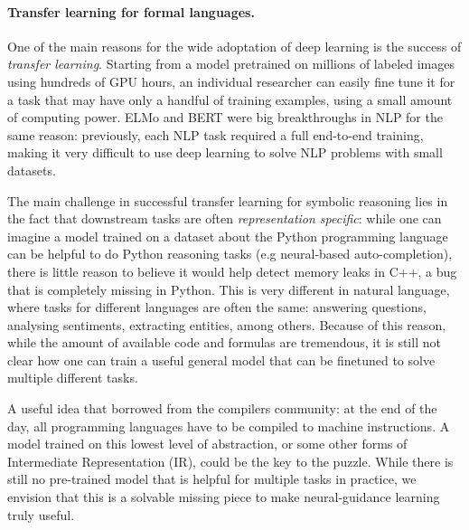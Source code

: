 \paragraph{Transfer learning for formal languages.} 
One of the main reasons for the wide adoptation of deep learning is the success of \emph{transfer learning}. Starting from a model pretrained on millions of labeled images using hundreds of GPU hours, an individual researcher can easily fine tune it for a task that may have only a handful of training examples, using a small amount of computing power. ELMo \cite{elmo} and BERT \cite{bert} were big breakthroughs in NLP for the same reason: previously, each NLP task required a full end-to-end training, making it very difficult to use deep learning to solve NLP problems with small datasets. 

The main challenge in successful transfer learning for symbolic reasoning lies in the fact that downstream tasks are often \emph{representation specific}: while one can imagine a model trained on a dataset about the Python programming language can be helpful to do Python reasoning tasks (e.g neural-based auto-completion), there is little reason to believe it would help detect memory leaks in C++, a bug that is completely missing in Python. This is very different in natural language, where tasks for different languages are often the same: answering questions, analysing sentiments, extracting entities, among others. Because of this reason, while the amount of available code and formulas are tremendous, it is still not clear how one can train a useful general model that can be finetuned to solve multiple different tasks. 

A useful idea that borrowed from the compilers community: at the end of the day, all programming languages have to be compiled to machine instructions. A model trained on this lowest level of abstraction, or some other forms of Intermediate Representation (IR), could be the key to the puzzle. While there is still no pre-trained model that is helpful for multiple tasks in practice, we envision that this is a solvable missing piece to make neural-guidance learning truly useful.
